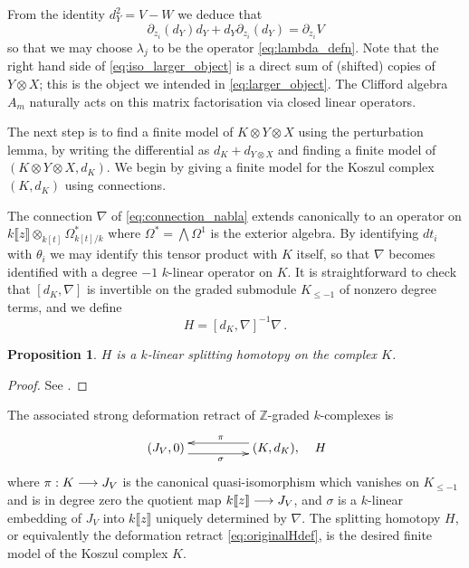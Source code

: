 \documentclass[english,letter paper,12pt,leqno]{article}
\newtheorem{proposition}[theorem]{Proposition}
\theoremstyle{example}
\numberwithin{equation}{section}
\begin{document}
From the identity $d^2_Y = V - W$ we deduce that
\[
\partial_{z_i}(d_Y) d_Y + d_Y \partial_{z_i}(d_Y) = \partial_{z_i} V
\]
so that we may choose $\lambda_j$ to be the operator \eqref{eq:lambda_defn}. Note that the right hand side of \eqref{eq:iso_larger_object} is a direct sum of (shifted) copies of $Y \otimes X$; this is the object we intended in \eqref{eq:larger_object}. The Clifford algebra $A_m$ naturally acts on this matrix factorisation via closed linear operators.

The next step is to find a finite model of $K \otimes Y \otimes X$ using the perturbation lemma, by writing the differential as $d_K + d_{Y \otimes X}$ and finding a finite model of $(K \otimes Y \otimes X, d_K)$. We begin by giving a finite model for the Koszul complex $(K, d_K)$ using connections.
\medskip

The connection $\nabla$ of \eqref{eq:connection_nabla} extends canonically to an operator on $k\llbracket z \rrbracket \otimes_{k[t]} \Omega^*_{k[t]/k}$ where $\Omega^* = \bigwedge \Omega^1$ is the exterior algebra. By identifying $d t_i$ with $\theta_i$ we may identify this tensor product with $K$ itself, so that $\nabla$ becomes identified with a degree $-1$ $k$-linear operator on $K$.  It is straightforward to check that $[d_K, \nabla]$ is invertible on the graded submodule $K_{\le -1}$ of nonzero degree terms, and we define
\[
H = [d_K, \nabla]^{-1} \nabla\,.
\]

\begin{proposition} $H$ is a $k$-linear splitting homotopy on the complex $K$.
\end{proposition}
\begin{proof}
See \cite[Section 8.1]{dm1102.2957}.
\end{proof}

The associated strong deformation retract of $\mathbb{Z}$-graded $k$-complexes is
\begin{equation}\label{eq:originalHdef}
\xymatrix@C+2pc{
(J_V,0) \ar@<-1ex>[r]_{\sigma} & (K, d_K), \ar@<-1ex>[l]_{\pi}
} \quad H
\end{equation}
where $\pi: K \longrightarrow J_V$ is the canonical quasi-isomorphism which vanishes on $K_{\le -1}$ and is in degree zero the quotient map $k\llbracket z \rrbracket \longrightarrow J_V$, and $\sigma$ is a $k$-linear embedding of $J_V$ into $k\llbracket z \rrbracket$ uniquely determined by $\nabla$. The splitting homotopy $H$, or equivalently the deformation retract \eqref{eq:originalHdef}, is the desired finite model of the Koszul complex $K$.
\end{document}
